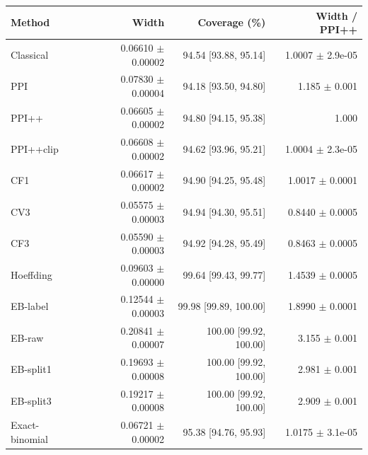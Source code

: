 \small
\begin{tabular}{lrrr}
\toprule
Method & Width & Coverage (\%) & Width / PPI++ \\
\midrule
Classical & 0.06610 $\pm$ 0.00002 & 94.54 [93.88, 95.14] & 1.0007 $\pm$ 2.9e-05 \\
PPI & 0.07830 $\pm$ 0.00004 & 94.18 [93.50, 94.80] & 1.185 $\pm$ 0.001 \\
PPI++ & 0.06605 $\pm$ 0.00002 & 94.80 [94.15, 95.38] & 1.000 \\
PPI++clip & 0.06608 $\pm$ 0.00002 & 94.62 [93.96, 95.21] & 1.0004 $\pm$ 2.3e-05 \\
CF1 & 0.06617 $\pm$ 0.00002 & 94.90 [94.25, 95.48] & 1.0017 $\pm$ 0.0001 \\
CV3 & 0.05575 $\pm$ 0.00003 & 94.94 [94.30, 95.51] & 0.8440 $\pm$ 0.0005 \\
CF3 & 0.05590 $\pm$ 0.00003 & 94.92 [94.28, 95.49] & 0.8463 $\pm$ 0.0005 \\
Hoeffding & 0.09603 $\pm$ 0.00000 & 99.64 [99.43, 99.77] & 1.4539 $\pm$ 0.0005 \\
EB-label & 0.12544 $\pm$ 0.00003 & 99.98 [99.89, 100.00] & 1.8990 $\pm$ 0.0001 \\
EB-raw & 0.20841 $\pm$ 0.00007 & 100.00 [99.92, 100.00] & 3.155 $\pm$ 0.001 \\
EB-split1 & 0.19693 $\pm$ 0.00008 & 100.00 [99.92, 100.00] & 2.981 $\pm$ 0.001 \\
EB-split3 & 0.19217 $\pm$ 0.00008 & 100.00 [99.92, 100.00] & 2.909 $\pm$ 0.001 \\
Exact-binomial & 0.06721 $\pm$ 0.00002 & 95.38 [94.76, 95.93] & 1.0175 $\pm$ 3.1e-05 \\
\bottomrule
\end{tabular}
